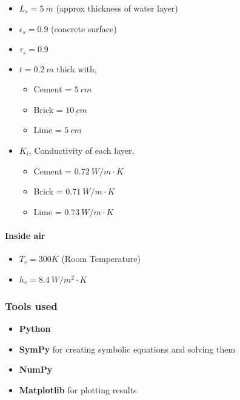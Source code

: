 \documentclass[11pt]{article}
\providecommand{\tightlist}{%
      \setlength{\itemsep}{0pt}\setlength{\parskip}{0pt}}
\begin{document}
\begin{itemize}
\tightlist
\item
  \(L_s = 5\ m\) (approx thickness of water layer)
\item
  \(\epsilon_s = 0.9\) (concrete surface)
\item
  \(\tau_s=0.9\)
\item
  \(t = 0.2\ m\) thick with,

  \begin{itemize}
  \tightlist
  \item
    Cement = \(5\ cm\)
  \item
    Brick = \(10\ cm\)
  \item
    Lime = \(5\ cm\)
  \end{itemize}
\item
  \(K_i\), Conductivity of each layer,

  \begin{itemize}
  \tightlist
  \item
    Cement = \(0.72\ W/m\cdot K\)
  \item
    Brick = \(0.71\ W/m\cdot K\)
  \item
    Lime = \(0.73\ W/m\cdot K\)
  \end{itemize}
\end{itemize}

\hypertarget{inside-air}{%
\paragraph{Inside air}\label{inside-air}}

\begin{itemize}
\tightlist
\item
  \(T_r = 300K\) (Room Temperature)
\item
  \(h_r = 8.4\ W/m^2\cdot K\)
\end{itemize}

    \hypertarget{tools-used}{%
\subsubsection{Tools used}\label{tools-used}}

\begin{itemize}
\tightlist
\item
  \textbf{Python}
\item
  \textbf{SymPy} for creating symbolic equations and solving them
\item
  \textbf{NumPy}
\item
  \textbf{Matplotlib} for plotting results
\end{itemize}
\end{document}
